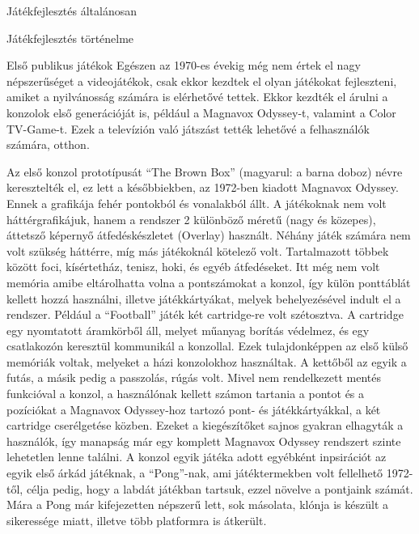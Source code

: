 \begin{MyChapter}{Játékfejlesztés általánosan}
\begin{MySection}{Játékfejlesztés történelme}
		\begin{MySubSection}{Első publikus játékok}
			Egészen az 1970-es évekig még nem értek el nagy népszerűséget a videojátékok, csak ekkor kezdtek el olyan játékokat fejleszteni, amiket a nyilvánosság számára is elérhetővé tettek. Ekkor kezdték el árulni a konzolok első generációját is, például a Magnavox Odyssey-t, valamint a Color TV-Game-t. Ezek a televízión való játszást tették lehetővé a felhasználók számára, otthon.
			
			Az első konzol prototípusát ``The Brown Box'' (magyarul: a barna doboz) névre keresztelték el, ez lett a későbbiekben, az 1972-ben kiadott Magnavox Odyssey. Ennek a grafikája fehér pontokból és vonalakból állt. A játékoknak nem volt háttérgrafikájuk, hanem a rendszer 2 különböző méretű (nagy és közepes), áttetsző képernyő átfedéskészletet (Overlay) használt. Néhány játék számára nem volt szükség háttérre, míg más játékoknál kötelező volt. Tartalmazott többek között foci, kísértetház, tenisz, hoki, és egyéb átfedéseket. Itt még nem volt memória amibe eltárolhatta volna a pontszámokat a konzol, így külön ponttáblát kellett hozzá használni, illetve játékkártyákat, melyek behelyezésével indult el a rendszer. Például a ``Football'' játék két cartridge-re volt szétosztva. A cartridge egy nyomtatott áramkörből áll, melyet műanyag borítás védelmez, és egy csatlakozón keresztül kommunikál a konzollal.
			Ezek tulajdonképpen az első külső memóriák voltak, melyeket a házi konzolokhoz használtak. A kettőből az egyik a futás, a másik pedig a passzolás, rúgás volt. Mivel nem rendelkezett mentés funkcióval a konzol, a használónak kellett számon tartania a pontot és a pozíciókat a Magnavox Odyssey-hoz tartozó pont- és játékkártyákkal, a két cartridge cserélgetése közben. Ezeket a kiegészítőket sajnos gyakran elhagyták a használók, így manapság már egy komplett Magnavox Odyssey rendszert szinte lehetetlen lenne találni.
			A konzol egyik játéka adott egyébként inpsirációt az egyik első árkád játéknak, a ``Pong''-nak, ami játéktermekben volt fellelhető 1972-től, célja pedig, hogy a labdát játékban tartsuk, ezzel növelve a pontjaink számát. Mára a Pong már kifejezetten népszerű lett, sok másolata, klónja is készült a sikeressége miatt, illetve több platformra is átkerült.
			\cite{magnavox-odyssey_01}
			\cite{magnavox-odyssey_02}
			

\end{MySubSection}
\end{MySection}
\end{MyChapter}
